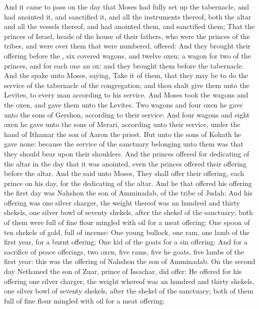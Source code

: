 \begin{biblechapter} %
 And it came to pass on the day that Moses had fully set up the tabernacle, and had anointed it, and sanctified it, and all the instruments thereof, both the altar and all the vessels thereof, and had anointed them, and sanctified them;
\verse That the princes of Israel, heads of the house of their fathers, who were the princes of the tribes, and were over them that were numbered, offered:
\verse And they brought their offering before the \LORD, six covered wagons, and twelve oxen; a wagon for two of the princes, and for each one an ox: and they brought them before the tabernacle.
\verse And the \LORD spake unto Moses, saying,
\verse Take it of them, that they may be to do the service of the tabernacle of the congregation; and thou shalt give them unto the Levites, to every man according to his service.
\verse And Moses took the wagons and the oxen, and gave them unto the Levites.
\verse Two wagons and four oxen he gave unto the sons of Gershon, according to their service:
\verse And four wagons and eight oxen he gave unto the sons of Merari, according unto their service, under the hand of Ithamar the son of Aaron the priest.
\verse But unto the sons of Kohath he gave none: because the service of the sanctuary belonging unto them was that they should bear upon their shoulders.
\verse And the princes offered for dedicating of the altar in the day that it was anointed, even the princes offered their offering before the altar.
\verse And the \LORD said unto Moses, They shall offer their offering, each prince on his day, for the dedicating of the altar.
\verse And he that offered his offering the first day was Nahshon the son of Amminadab, of the tribe of Judah:
\verse And his offering was one silver charger, the weight thereof was an hundred and thirty shekels, one silver bowl of seventy shekels, after the shekel of the sanctuary; both of them were full of fine flour mingled with oil for a meat offering:
\verse One spoon of ten shekels of gold, full of incense:
\verse One young bullock, one ram, one lamb of the first year, for a burnt offering:
\verse One kid of the goats for a sin offering:
\verse And for a sacrifice of peace offerings, two oxen, five rams, five he goats, five lambs of the first year: this was the offering of Nahshon the son of Amminadab.
\verse On the second day Nethaneel the son of Zuar, prince of Issachar, did offer:
\verse He offered for his offering one silver charger, the weight whereof was an hundred and thirty shekels, one silver bowl of seventy shekels, after the shekel of the sanctuary; both of them full of fine flour mingled with oil for a meat offering:

\end{biblechapter}
